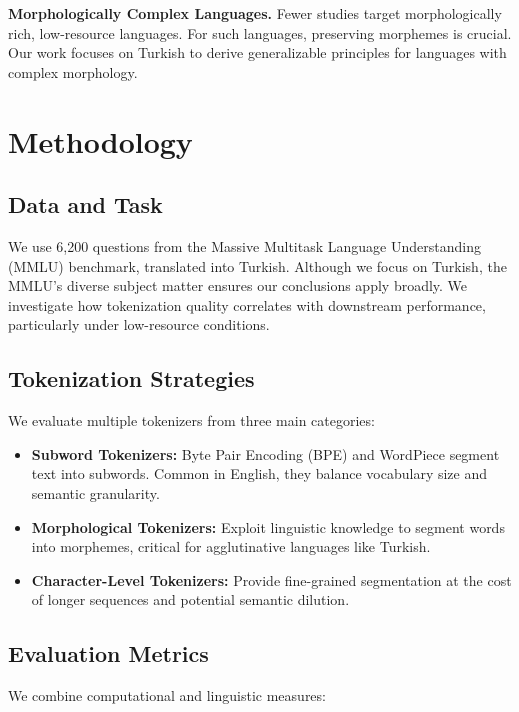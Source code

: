   \textbf{Morphologically Complex Languages.} Fewer studies target morphologically rich, low-resource languages. For such languages, preserving morphemes is crucial. Our work focuses on Turkish to derive generalizable principles for languages with complex morphology.
  
  \section{Methodology}
  
  \subsection{Data and Task}
  
  We use 6,200 questions from the Massive Multitask Language Understanding (MMLU) benchmark, translated into Turkish. Although we focus on Turkish, the MMLU’s diverse subject matter ensures our conclusions apply broadly. We investigate how tokenization quality correlates with downstream performance, particularly under low-resource conditions.
  
  \subsection{Tokenization Strategies}
  
  We evaluate multiple tokenizers from three main categories:
  
  \begin{itemize}
      \item \textbf{Subword Tokenizers:} Byte Pair Encoding (BPE) and WordPiece segment text into subwords. Common in English, they balance vocabulary size and semantic granularity.
      \item \textbf{Morphological Tokenizers:} Exploit linguistic knowledge to segment words into morphemes, critical for agglutinative languages like Turkish.
      \item \textbf{Character-Level Tokenizers:} Provide fine-grained segmentation at the cost of longer sequences and potential semantic dilution.
  \end{itemize}
  
  \subsection{Evaluation Metrics}
  
  We combine computational and linguistic measures:
  
